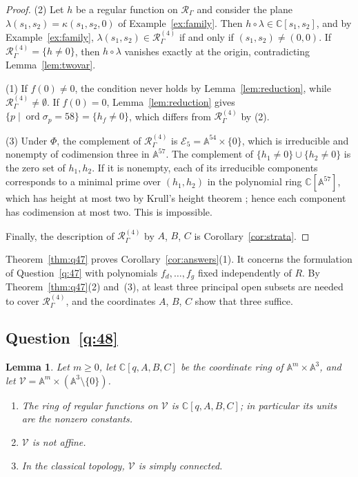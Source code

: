 \documentclass{amsart}
\newtheorem{lemma}[theorem]{Lemma}
\theoremstyle{definition}
\theoremstyle{remark}
\numberwithin{equation}{section}
\newcommand{\CC}{\mathbb{C}}
\newcommand{\AF}{\mathbb{A}}
\newcommand{\Rs}{\mathcal{R}_\Gamma}
\newcommand{\Rd}[1]{\mathcal{R}^{(#1)}_\Gamma}
\newcommand{\Ed}[1]{\mathcal{E}_{#1}}
\DeclareMathOperator{\ord}{ord}
\begin{document}
\begin{proof}
(2) Let $h$ be a regular function on $\Rs$ and consider the plane $\lambda(s_1,s_2)=\kappa(s_1,s_2,0)$ of Example~\ref{ex:family}. Then $h\circ\lambda\in\CC[s_1,s_2]$, and by Example~\ref{ex:family}, $\lambda(s_1,s_2)\in\Rd{4}$ if and only if $(s_1,s_2)\ne(0,0)$. If $\Rd{4}=\{h\ne0\}$, then $h\circ\lambda$ vanishes exactly at the origin, contradicting Lemma~\ref{lem:twovar}.

(1) If $f(0)\ne0$, the condition never holds by Lemma~\ref{lem:reduction}, while $\Rd{4}\ne\emptyset$. If $f(0)=0$, Lemma~\ref{lem:reduction} gives $\{p\mid\ord\sigma_p=58\}=\{h_f\ne0\}$, which differs from $\Rd{4}$ by (2).

(3) Under $\Phi$, the complement of $\Rd{4}$ is $\Ed{5}=\AF^{54}\times\{0\}$, which is irreducible and nonempty of codimension three in $\AF^{57}$. The complement of $\{h_1\ne0\}\cup\{h_2\ne0\}$ is the zero set of $h_1,h_2$. If it is nonempty, each of its irreducible components corresponds to a minimal prime over $(h_1,h_2)$ in the polynomial ring $\CC[\AF^{57}]$, which has height at most two by Krull's height theorem \cite[Theorem~13.5]{Mat86}; hence each component has codimension at most two. This is impossible.

Finally, the description of $\Rd{4}$ by $A$, $B$, $C$ is Corollary~\ref{cor:strata}.
\end{proof}

Theorem~\ref{thm:q47} proves Corollary~\ref{cor:answers}(1). It concerns the formulation of Question~\ref{q:47} with polynomials $f_d,\dots,f_g$ fixed independently of $R$. By Theorem~\ref{thm:q47}(2) and~(3), at least three principal open subsets are needed to cover $\Rd{4}$, and the coordinates $A$, $B$, $C$ show that three suffice.

\subsection{Question~\ref{q:48}}

\begin{lemma}\label{lem:nonaffine}
Let $m\ge0$, let $\CC[q,A,B,C]$ be the coordinate ring of $\AF^m\times\AF^3$, and let $\mathcal V=\AF^m\times(\AF^3\setminus\{0\})$.
\begin{enumerate}
\item The ring of regular functions on $\mathcal V$ is $\CC[q,A,B,C]$; in particular its units are the nonzero constants.
\item $\mathcal V$ is not affine.
\item In the classical topology, $\mathcal V$ is simply connected.
\end{enumerate}
\end{lemma}
\end{document}
